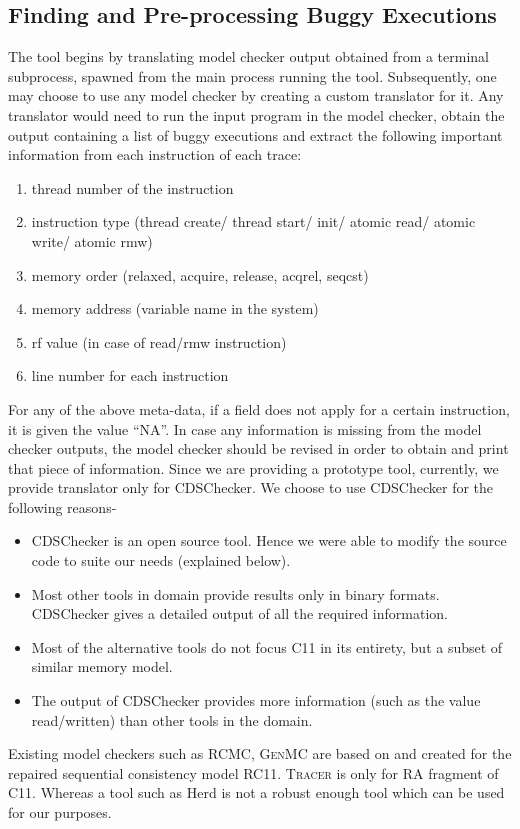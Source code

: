 \subsection{Finding and Pre-processing Buggy Executions}
The tool begins by translating model checker output obtained from a 
terminal subprocess, spawned from the main process running the tool. 
Subsequently, one may choose to use any model checker by creating a 
custom translator for it. Any translator would need to run the input program in the model checker, 
obtain the output containing a list of buggy executions and 
extract the following important information from each instruction 
of each trace:
%
\begin{enumerate}
	\item thread number of the instruction
	\item instruction type (thread create/ thread start/ init/ atomic read/ atomic write/ atomic rmw)
	\item memory order (relaxed, acquire, release, acq\textunderscore rel, seq\textunderscore cst)
	\item memory address (variable name in the system)
	\item rf value (in case of read/rmw instruction)
	\item line number for each instruction
\end{enumerate}
For any of the above meta-data, if a field does not apply for a certain instruction, 
it is given the value ``NA''. In case any information is missing from 
the model checker outputs, the model checker should be revised in order 
to obtain and print that piece of information. 
%
Since we are providing a prototype tool, 
currently, we provide translator only for CDSChecker. 
We choose to use CDSChecker for the following reasons- 
\begin{itemize}
	\item CDSChecker is an open source tool. Hence we were able 
	to modify the source code to suite our needs (explained below).
	
	\item Most other tools in domain provide results only in binary formats.
	CDSChecker gives a detailed output of all the required information.
	
	\item Most of the alternative tools do not focus C11 in its entirety, 
	but a subset of similar memory model.
	
	\item The output of CDSChecker provides more information 
	(such as the value read/written) than other tools in the domain.
\end{itemize}
Existing model checkers such as \textsc{RCMC}\cite{rcmc-POPL18},  
\textsc{GenMC}\cite{genmc-OOPSLA19,genmc-PLDI19} are based on and created for the 
repaired sequential consistency model RC11\cite{LahavVafeiadis-PLDI17}.
\textsc{Tracer}\cite{tracer2018} is only for RA fragment of C11.
Whereas a tool such as Herd\cite{herd} is not a 
robust enough tool which can be used for our purposes. 

